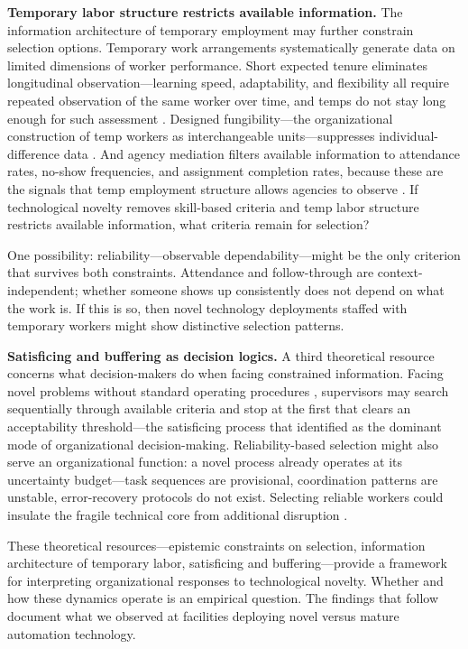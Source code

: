 \documentclass[12pt]{article}
\begin{document}
\textbf{Temporary labor structure restricts available information.} The information architecture of temporary employment may further constrain selection options. Temporary work arrangements systematically generate data on limited dimensions of worker performance. Short expected tenure eliminates longitudinal observation---learning speed, adaptability, and flexibility all require repeated observation of the same worker over time, and temps do not stay long enough for such assessment \citep{bidwell2011paying}. Designed fungibility---the organizational construction of temp workers as interchangeable units---suppresses individual-difference data \citep{pfeffer1988taking, kalleberg2000nonstandard}. And agency mediation filters available information to attendance rates, no-show frequencies, and assignment completion rates, because these are the signals that temp employment structure allows agencies to observe \citep{autor2001wiring}. If technological novelty removes skill-based criteria and temp labor structure restricts available information, what criteria remain for selection?

One possibility: reliability---observable dependability---might be the only criterion that survives both constraints. Attendance and follow-through are context-independent; whether someone shows up consistently does not depend on what the work is. If this is so, then novel technology deployments staffed with temporary workers might show distinctive selection patterns.

\textbf{Satisficing and buffering as decision logics.} A third theoretical resource concerns what decision-makers do when facing constrained information. Facing novel problems without standard operating procedures \citep{cyert1963behavioral}, supervisors may search sequentially through available criteria and stop at the first that clears an acceptability threshold---the satisficing process that \citet{simon1947administrative} identified as the dominant mode of organizational decision-making. Reliability-based selection might also serve an organizational function: a novel process already operates at its uncertainty budget---task sequences are provisional, coordination patterns are unstable, error-recovery protocols do not exist. Selecting reliable workers could insulate the fragile technical core from additional disruption \citep{thompson1967organizations}.

These theoretical resources---epistemic constraints on selection, information architecture of temporary labor, satisficing and buffering---provide a framework for interpreting organizational responses to technological novelty. Whether and how these dynamics operate is an empirical question. The findings that follow document what we observed at facilities deploying novel versus mature automation technology.
\end{document}
